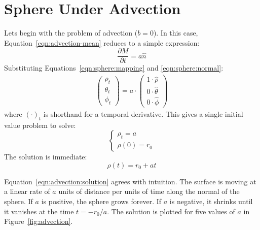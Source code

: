 \documentclass[journal]{IEEEtran}
\begin{document}
\section{Sphere Under Advection}
\label{sec:advection}
Lets begin with the problem of advection ($b = 0$).
In this case, Equation~\ref{eqn:advection-mean} reduces to a simple expression:
\begin{equation}
  \frac{\partial M}{\partial t} = a \hat{n}
\end{equation}
Substituting Equations~\ref{eqn:sphere:mapping} and \ref{eqn:sphere:normal}:
\begin{align}
  \begin{pmatrix}
    \rho_t \\
    \theta_t \\
    \phi_t
  \end{pmatrix} = a \cdot
  \begin{pmatrix}
    1 \cdot \hat{\rho} \\
    0 \cdot \hat{\theta} \\
    0 \cdot \hat{\phi}
  \end{pmatrix}
\end{align}
where $\left(\cdot\right)_t$ is shorthand for a temporal derivative.
This gives a single initial value problem to solve:
\begin{equation}
  \left\{
    \begin{array}{ll}
      \rho_t = a\\
      \rho(0) = r_0
    \end{array}
  \right.
\end{equation}
The solution is immediate:
\begin{equation}
  \label{eqn:advection:solution}
  \rho(t) = r_0 + at
\end{equation}

Equation~\ref{eqn:advection:solution} agrees with intuition.
The surface is moving at a linear rate of $a$ units of distance per units of time along the normal of the sphere.
If $a$ is positive, the sphere grows forever.
If $a$ is negative, it shrinks until it vanishes at the time $t = -r_0/a$.
The solution is plotted for five values of $a$ in Figure~\ref{fig:advection}.
\end{document}
